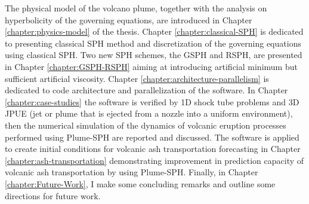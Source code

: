 The physical model of the volcano plume, together with the analysis on hyperbolicity of the governing equations, are introduced in Chapter \ref{chapter:physics-model} of the thesis. Chapter \ref{chapter:classical-SPH} is dedicated to presenting
classical SPH method and discretization of the governing equations using classical SPH. Two new SPH schemes, the GSPH and RSPH, are presented in Chapter \ref{chapter:GSPH-RSPH} aiming at introducing artificial minimum but sufficient artificial viscosity. Chapter \ref{chapter:architecture-parallelism} is dedicated to code architecture and parallelization of the software. In Chapter \ref{chapter:case-studies} the software is verified by 1D shock tube problems and 3D JPUE (jet or plume that is ejected from a nozzle into a uniform environment), then the numerical simulation of the dynamics of volcanic eruption processes performed using Plume-SPH are reported and discussed. The software is applied to create initial conditions for volcanic ash transportation forecasting in Chapter \ref{chapter:ash-transportation} demonstrating improvement in prediction capacity of volcanic ash transportation by using Plume-SPH. Finally, in Chapter \ref{chapter:Future-Work}, I
make some concluding remarks and outline some directions for future work.